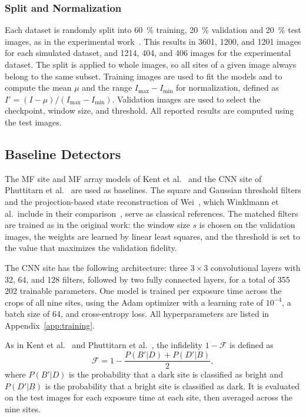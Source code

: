 \subsubsection{Split and Normalization}

Each dataset is randomly split into \SI{60}{\percent} training, \SI{20}{\percent} validation and \SI{20}{\percent} test images, as in the experimental work~\cite{phuttitarn2023}. This results in 3601, 1200, and 1201 images for each simulated dataset, and 1214, 404, and 406 images for the experimental dataset.
The split is applied to whole images, so all sites of a given image always belong to the same subset.
Training images are used to fit the models and to compute the mean $\mu$ and the range $I_{\max}-I_{\min}$ for normalization, defined as $I' = (I-\mu)/(I_{\max}-I_{\min})$.
Validation images are used to select the checkpoint, window size, and threshold. All reported results are computed using the test images.

\subsection{Baseline Detectors}

The MF site and MF array models of Kent et al.~\cite{kent2025} and the CNN site of Phuttitarn et al.~\cite{phuttitarn2023} are used as baselines. The square and Gaussian threshold filters and the projection-based state reconstruction of Wei~\cite{wei2023}, which Winklmann et al.\ include in their comparison~\cite{winklmann2024}, serve as classical references. The matched filters are trained as in the original work: the window size $s$ is chosen on the validation images, the weights are learned by linear least squares, and the threshold is set to the value that maximizes the validation fidelity.


The CNN site has the following architecture: three $3\times3$ convolutional layers with 32, 64, and 128 filters, followed by two fully connected layers, for a total of 355\,202 trainable parameters. One model is trained per exposure time across the crops of all nine sites, using the Adam optimizer with a learning rate of $10^{-4}$, a batch size of 64, and cross-entropy loss. All hyperparameters are listed in Appendix~\ref{app:training}.


As in Kent et al.~\cite{kent2025} and Phuttitarn et al.~\cite{phuttitarn2023}, the infidelity $1-\mathcal{F}$ is defined as
\begin{equation}
 \mathcal{F} = 1 - \frac{P(B'|D) + P(D'|B)}{2},
\label{eq:fidelity}
\end{equation}
where $P(B'|D)$ is the probability that a dark site is classified as bright and $P(D'|B)$ is the probability that a bright site is classified as dark. It is evaluated on the test images for each exposure time at each site, then averaged across the nine sites.

